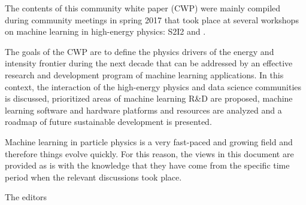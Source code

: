 The contents of this community white paper (CWP) were mainly compiled during community meetings in spring 2017 that took place at several workshops on machine learning in high-energy physics: S2I2 and \cite{DSatHEP2017,IML2017,ACAT2017,HSF2017}.

The goals of the CWP are to define the physics drivers of the energy and intensity frontier during the next decade that can be addressed by an effective research and development program of machine learning applications. In this context, the interaction of the high-energy physics and data science communities is discussed, prioritized areas of machine learning R\&D are proposed, machine learning software and hardware platforms and resources are analyzed and a roadmap of future sustainable development is presented.

Machine learning in particle physics is a very fast-paced and growing field and therefore things evolve quickly. For this reason, the views in this document are provided as is with the knowledge that they have come from the specific time period when the relevant discussions took place.

\bigskip

The editors
